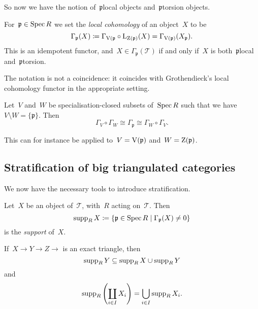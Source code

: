 \documentclass[10pt,a4paper]{article}
\begin{document}
So now we have the notion of~$\mathfrak{p}$\dash local objects and~$\mathfrak{p}$\dash torsion objects.

\begin{definition}
  For~$\mathfrak{p}\in\operatorname{Spec} R$ we set the \emph{local cohomology} of an object~$X$ to be
  \begin{equation}
    \Gamma_{\mathfrak{p}}(X)\coloneqq\Gamma_{\operatorname{V}(\mathfrak{p}}\circ\operatorname{L}_{\operatorname{Z}(\mathfrak{p})}(X)=\Gamma_{\operatorname{V}(\mathfrak{p})}(X_{\mathfrak{p}}).
  \end{equation}
  This is an idempotent functor, and~$X\in\Gamma_{\mathfrak{p}}(\mathcal{T})$ if and only if~$X$ is both~$\mathfrak{p}$\dash local and~$\mathfrak{p}$\dash torsion.
\end{definition}

\begin{remark}
  The notation is not a coincidence: it coincides with Grothendieck's local cohomology functor in the appropriate setting.
\end{remark}

\begin{lemma}
  Let~$V$ and~$W$ be specialisation-closed subsets of~$\operatorname{Spec} R$ such that we have~$V\setminus W=\{\mathfrak{p}\}$. Then
  \begin{equation}
    \Gamma_V\circ\Gamma_W\cong\Gamma_{\mathfrak{p}}\cong\Gamma_W\circ\Gamma_V.
  \end{equation}
\end{lemma}
This can for instance be applied to~$V=\operatorname{V}(\mathfrak{p})$ and~$W=\operatorname{Z}(\mathfrak{p})$.

\subsection{Stratification of big triangulated categories}
We now have the necessary tools to introduce stratification.
\begin{definition}
  Let~$X$ be an object of~$\mathcal{T}$, with~$R$ acting on~$\mathcal{T}$. Then
  \begin{equation}
    \operatorname{supp}_R X\coloneqq\left\{ \mathfrak{p}\in\operatorname{Spec} R\mid\Gamma_{\mathfrak{p}}(X)\neq 0 \right\}
  \end{equation}
  is the \emph{support} of~$X$.
\end{definition}
\begin{remark}
  If~$X\to Y\to Z\to$ is an exact triangle, then
  \begin{equation}
    \operatorname{supp}_R Y\subseteq\operatorname{supp}_R X\cup\operatorname{supp}_R Y
  \end{equation}
  and
  \begin{equation}
    \operatorname{supp}_R\left( \coprod_{i\in I}X_i \right)=\bigcup_{i\in I}\operatorname{supp}_R X_i.
  \end{equation}
\end{remark}
\end{document}

